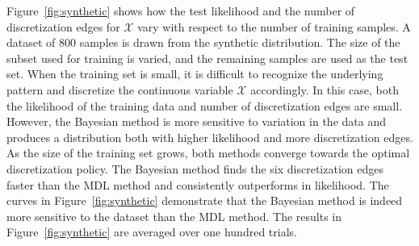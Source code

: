 \documentclass[twoside,11pt]{article}
\newcommand{\todo}[1]{\textcolor{magenta}{#1}}
\newcommand{\tim}[1]{\textit{\textcolor{blue}{#1}}}
\newcommand{\cX}{\mathcal{X}} %
\begin{document}
Figure~\ref{fig:synthetic} shows how the test likelihood and the number of discretization edges for $\cX$ vary with respect to the number of training samples.
A dataset of \num{800} samples is drawn from the synthetic distribution.
The size of the subset used for training is varied, and the remaining samples are used as the test set.
When the training set is small, it is difficult to recognize the underlying pattern and discretize the continuous variable $\cX$ accordingly.
In this case, both the likelihood of the training data and number of discretization edges are small.
However, the Bayesian method is more sensitive to variation in the data and produces a distribution both with higher likelihood and more discretization edges.
As the size of the training set grows, both methods converge towards the optimal discretization policy.
The Bayesian method finds the six discretization edges faster than the MDL method and consistently outperforms in likelihood.
The curves in Figure~\ref{fig:synthetic} demonstrate that the Bayesian method is indeed more sensitive to the dataset than the MDL method.
The results in Figure~\ref{fig:synthetic} are averaged over one hundred trials.


\end{document}
